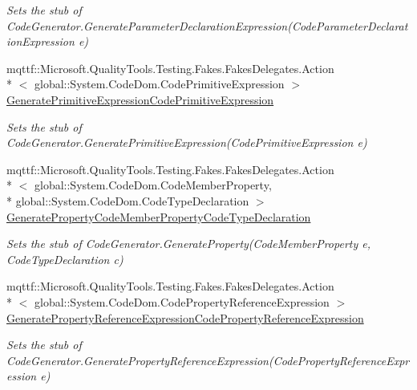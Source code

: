 \begin{DoxyCompactItemize}
\begin{DoxyCompactList}\small\item\em Sets the stub of Code\-Generator.\-Generate\-Parameter\-Declaration\-Expression(\-Code\-Parameter\-Declaration\-Expression e)\end{DoxyCompactList}\item 
mqttf\-::\-Microsoft.\-Quality\-Tools.\-Testing.\-Fakes.\-Fakes\-Delegates.\-Action\\*
$<$ global\-::\-System.\-Code\-Dom.\-Code\-Primitive\-Expression $>$ \hyperlink{class_system_1_1_code_dom_1_1_compiler_1_1_fakes_1_1_stub_code_generator_a2190e8bd7d653d6afe2ccba404a0acae}{Generate\-Primitive\-Expression\-Code\-Primitive\-Expression}
\begin{DoxyCompactList}\small\item\em Sets the stub of Code\-Generator.\-Generate\-Primitive\-Expression(\-Code\-Primitive\-Expression e)\end{DoxyCompactList}\item 
mqttf\-::\-Microsoft.\-Quality\-Tools.\-Testing.\-Fakes.\-Fakes\-Delegates.\-Action\\*
$<$ global\-::\-System.\-Code\-Dom.\-Code\-Member\-Property, \\*
global\-::\-System.\-Code\-Dom.\-Code\-Type\-Declaration $>$ \hyperlink{class_system_1_1_code_dom_1_1_compiler_1_1_fakes_1_1_stub_code_generator_a2b3239899801b466f114022f50f37b6c}{Generate\-Property\-Code\-Member\-Property\-Code\-Type\-Declaration}
\begin{DoxyCompactList}\small\item\em Sets the stub of Code\-Generator.\-Generate\-Property(\-Code\-Member\-Property e, Code\-Type\-Declaration c)\end{DoxyCompactList}\item 
mqttf\-::\-Microsoft.\-Quality\-Tools.\-Testing.\-Fakes.\-Fakes\-Delegates.\-Action\\*
$<$ global\-::\-System.\-Code\-Dom.\-Code\-Property\-Reference\-Expression $>$ \hyperlink{class_system_1_1_code_dom_1_1_compiler_1_1_fakes_1_1_stub_code_generator_a362210bb8034da7bf13ebbad52561311}{Generate\-Property\-Reference\-Expression\-Code\-Property\-Reference\-Expression}
\begin{DoxyCompactList}\small\item\em Sets the stub of Code\-Generator.\-Generate\-Property\-Reference\-Expression(\-Code\-Property\-Reference\-Expression e)\end{DoxyCompactList}\item 

\end{DoxyCompactItemize}
